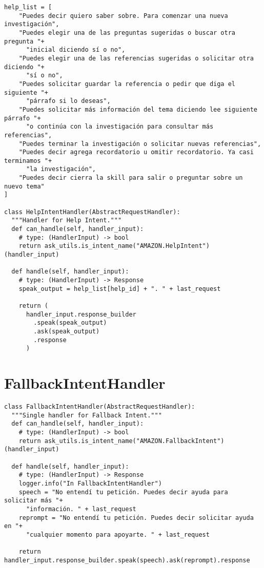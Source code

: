 \begin{tcolorbox}[colback=white!25!white,colframe=blue]
  \begin{verbatim}
help_list = [
    "Puedes decir quiero saber sobre. Para comenzar una nueva investigación",
    "Puedes elegir una de las preguntas sugeridas o buscar otra pregunta "+
      "inicial diciendo sí o no",
    "Puedes elegir una de las referencias sugeridas o solicitar otra diciendo "+
      "sí o no",
    "Puedes solicitar guardar la referencia o pedir que diga el siguiente "+
      "párrafo si lo deseas",
    "Puedes solicitar más información del tema diciendo lee siguiente párrafo "+
      "o continúa con la investigación para consultar más referencias",
    "Puedes terminar la investigación o solicitar nuevas referencias",
    "Puedes decir agrega recordatorio u omitir recordatorio. Ya casi terminamos "+
      "la investigación",
    "Puedes decir cierra la skill para salir o preguntar sobre un nuevo tema"
]

class HelpIntentHandler(AbstractRequestHandler):
  """Handler for Help Intent."""
  def can_handle(self, handler_input):
    # type: (HandlerInput) -> bool
    return ask_utils.is_intent_name("AMAZON.HelpIntent")(handler_input)

  def handle(self, handler_input):
    # type: (HandlerInput) -> Response
    speak_output = help_list[help_id] + ". " + last_request

    return (
      handler_input.response_builder
        .speak(speak_output)
        .ask(speak_output)
        .response
      )
  \end{verbatim}
\end{tcolorbox}


\section{FallbackIntentHandler}
\label{A5Anexo}

\begin{tcolorbox}[colback=white!25!white,colframe=blue]
  \begin{verbatim}
class FallbackIntentHandler(AbstractRequestHandler):
  """Single handler for Fallback Intent."""
  def can_handle(self, handler_input):
    # type: (HandlerInput) -> bool
    return ask_utils.is_intent_name("AMAZON.FallbackIntent")(handler_input)

  def handle(self, handler_input):
    # type: (HandlerInput) -> Response
    logger.info("In FallbackIntentHandler")
    speech = "No entendí tu petición. Puedes decir ayuda para solicitar más "+
      "información. " + last_request
    reprompt = "No entendí tu petición. Puedes decir solicitar ayuda en "+
      "cualquier momento para apoyarte. " + last_request

    return handler_input.response_builder.speak(speech).ask(reprompt).response
  \end{verbatim}
\end{tcolorbox}

